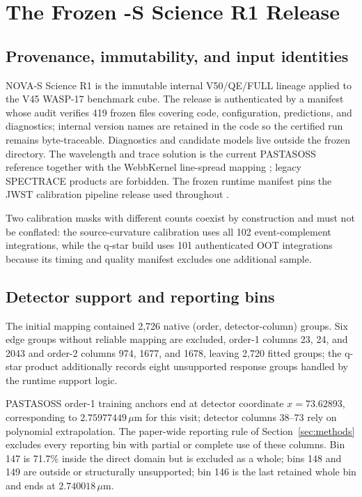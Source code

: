 \section{The Frozen \nova{}-S Science R1 Release}
\label{app:nova}

\subsection{Provenance, immutability, and input identities}

NOVA-S Science R1 is the immutable internal V50/QE/FULL lineage applied to
the V45 WASP-17 benchmark cube. The release is authenticated by a manifest
whose audit verifies 419 frozen files covering code, configuration,
predictions, and diagnostics; internal version names are retained in the
code so the certified run remains byte-traceable. Diagnostics and candidate
models live outside the frozen directory. The wavelength and trace solution
is the current PASTASOSS reference
\citep{BainesEtAl2023Trace,BainesEtAl2023Wavelength} together with the
WebbKernel line-spread mapping \citep{DarveauBernierEtAl2022}; legacy
SPECTRACE products are forbidden. The frozen runtime manifest pins the JWST
calibration pipeline release used throughout \citep{JWSTPipeline2025}.

Two calibration masks with different counts coexist by construction and must
not be conflated: the source-curvature calibration uses all 102
event-complement integrations, while the q-star build uses 101 authenticated
OOT integrations because its timing and quality manifest excludes one
additional sample.

\subsection{Detector support and reporting bins}

The initial mapping contained 2{,}726 native (order, detector-column)
groups. Six edge groups without reliable mapping are excluded, order-1
columns 23, 24, and 2043 and order-2 columns 974, 1677, and 1678, leaving
2{,}720 fitted groups; the q-star product additionally records eight
unsupported response groups handled by the runtime support logic.

PASTASOSS order-1 training anchors end at detector coordinate
$x=73.62893$, corresponding to $2.75977449\,\mu\mathrm{m}$ for this visit;
detector columns 38--73 rely on polynomial extrapolation. The paper-wide
reporting rule of Section~\ref{sec:methods} excludes every reporting bin
with partial or complete use of these columns. Bin 147 is 71.7\% inside the
direct domain but is excluded as a whole; bins 148 and 149 are outside or
structurally unsupported; bin 146 is the last retained whole bin and ends at
$2.740018\,\mu\mathrm{m}$.

